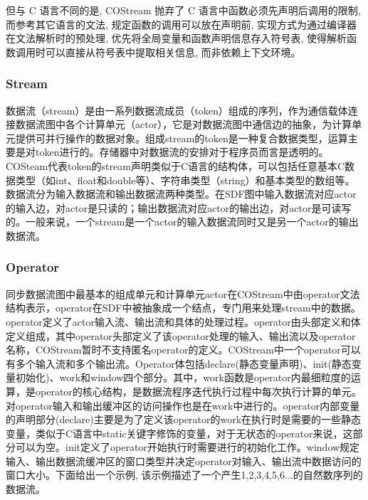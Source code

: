 但与 C 语言不同的是, COStream 抛弃了 C 语言中函数必须先声明后调用的限制, 而参考其它语言的文法, 规定函数的调用可以放在声明前, 实现方式为通过编译器在文法解析时的预处理, 优先将全局变量和函数声明信息存入符号表, 使得解析函数调用时可以直接从符号表中提取相关信息, 而非依赖上下文环境。

\subsubsection{Stream}
数据流（stream）是由一系列数据流成员（token）组成的序列，作为通信载体连接数据流图中各个计算单元（actor），它是对数据流图中通信边的抽象，为计算单元提供可并行操作的数据对象。组成stream的token是一种复合数据类型，运算主要是对token进行的。存储器中对数据流的安排对于程序员而言是透明的。COSteam代表token的stream声明类似于C语言的结构体，可以包括任意基本C数据类型（如int、float和double等）、字符串类型（string）和基本类型的数组等。数据流分为输入数据流和输出数据流两种类型。在SDF图中输入数据流对应actor的输入边，对actor是只读的；输出数据流对应actor的输出边，对actor是可读写的。一般来说，一个stream是一个actor的输入数据流同时又是另一个actor的输出数据流。

\subsubsection{Operator}

同步数据流图中最基本的组成单元和计算单元actor在COStream中由operator文法结构表示，operator在SDF中被抽象成一个结点，专门用来处理stream中的数据。operator定义了actor输入流、输出流和具体的处理过程。operator由头部定义和体定义组成，其中operator头部定义了该operator处理的输入、输出流以及operator名称，COStream暂时不支持匿名operator的定义。COStream中一个operator可以有多个输入流和多个输出流。Operator体包括declare(静态变量声明)、init(静态变量初始化)、work和window四个部分。其中，work函数是operator内最细粒度的运算，是operator的核心结构，是数据流程序迭代执行过程中每次执行计算的单元。对operator输入和输出缓冲区的访问操作也是在work中进行的。operator内部变量的声明部分(declare)主要是为了定义该operator的work在执行时是需要的一些静态变量，类似于C语言中static关键字修饰的变量，对于无状态的operator来说，这部分可以为空。init定义了operator开始执行时需要进行的初始化工作。window规定输入、输出数据流缓冲区的窗口类型并决定operator对输入、输出流中数据访问的窗口大小。下面给出一个示例, 该示例描述了一个产生1,2,3,4,5,6...的自然数序列的数据流。

